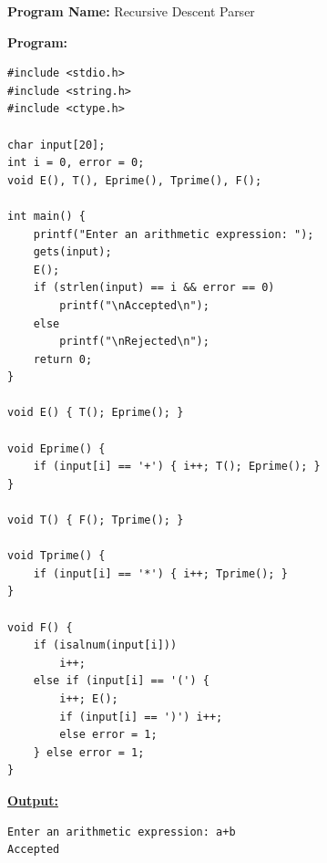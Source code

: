 \documentclass[11pt,a4paper]{article}
\begin{document}
\clearpage
\noindent\textbf{\large Program Name:} Recursive Descent Parser\par\vspace{0.6em}
\noindent\textbf{\large Program:}\par\vspace{0.3em}
\begin{lstlisting}
#include <stdio.h>
#include <string.h>
#include <ctype.h>

char input[20];
int i = 0, error = 0;
void E(), T(), Eprime(), Tprime(), F();

int main() {
    printf("Enter an arithmetic expression: ");
    gets(input);
    E();
    if (strlen(input) == i && error == 0)
        printf("\nAccepted\n");
    else
        printf("\nRejected\n");
    return 0;
}

void E() { T(); Eprime(); }

void Eprime() {
    if (input[i] == '+') { i++; T(); Eprime(); }
}

void T() { F(); Tprime(); }

void Tprime() {
    if (input[i] == '*') { i++; Tprime(); }
}

void F() {
    if (isalnum(input[i]))
        i++;
    else if (input[i] == '(') {
        i++; E();
        if (input[i] == ')') i++;
        else error = 1;
    } else error = 1;
}
\end{lstlisting}

\clearpage
\noindent\textbf{\underline{Output:}}\par\vspace{0.4em}
\begin{lstlisting}
Enter an arithmetic expression: a+b
Accepted
\end{lstlisting}
\end{document}
